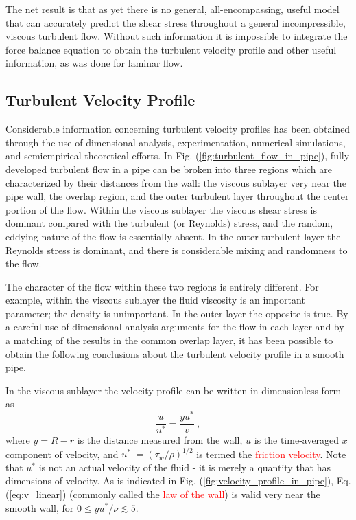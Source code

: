 \documentclass[12pt,a4paper]{article}
\newcounter{theo}[section]\setcounter{theo}{0}
\begin{document}
The net result is that as yet there is no general, all-encompassing, useful model that can accurately predict the shear stress throughout a general incompressible, viscous turbulent flow. Without such information it is impossible to integrate the force balance equation to obtain the turbulent velocity profile and other useful information, as was done for laminar flow.

\subsection{Turbulent Velocity Profile}
\cite{munson2009fundamentals, munson2012fundamentals} Considerable information concerning turbulent velocity profiles has been obtained through the use of dimensional analysis, experimentation, numerical simulations, and semiempirical theoretical efforts. In Fig. (\ref{fig:turbulent_flow_in_pipe}), fully developed turbulent flow in a pipe can be broken into three regions which are characterized by their distances from the wall: the viscous sublayer very near the pipe wall, the overlap region, and the outer turbulent layer throughout the center portion of the flow. Within the viscous sublayer the viscous shear stress is dominant compared with the turbulent (or Reynolds) stress, and the random, eddying nature of the flow is essentially absent. In the outer turbulent layer the Reynolds stress is dominant, and there is considerable mixing and randomness to the flow.

The character of the flow within these two regions is entirely different. For example, within the viscous sublayer the fluid viscosity is an important parameter; the density is unimportant. In the outer layer the opposite is true. By a careful use of dimensional analysis arguments for the flow in each layer and by a matching of the results in the common overlap layer, it has been possible to obtain the following conclusions about the turbulent velocity profile in a smooth pipe. 

In the viscous sublayer the velocity profile can be written in dimensionless form as
\begin{equation}
\dfrac{\overline{u}}{u^\ast} = \dfrac{y u^\ast}{v}  ~,
\label{eq:v_linear}
\end{equation}
where $y = R - r$ is the distance measured from the wall, $\overline{u}$ is the time-averaged $x$ component of velocity, and $u^\ast 􏰔= (\tau_w/\rho)^{1/2}$ is termed the \textcolor{red}{friction velocity}. Note that $u^\ast $ is not an actual velocity of the fluid - it is merely a quantity that has dimensions of velocity. As is indicated in Fig. (\ref{fig:velocity_profile_in_pipe}), Eq. (\ref{eq:v_linear}) (commonly called the \textcolor{red}{law of the wall}) is valid very near the smooth wall, for $0 \leqslant yu^\ast /\nu \lesssim 5$.
\end{document}
